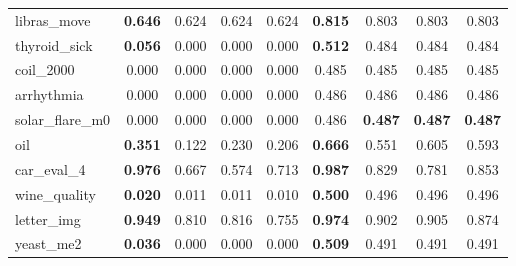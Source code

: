\begin{figure}[ht]
\begin{tabular}{p{22mm}|*4{p{14mm}}|*4{p{14mm}}}
        libras\_move&\multicolumn{1}{c}{\textbf{0.646}}&\multicolumn{1}{c}{0.624}&\multicolumn{1}{c}{0.624}&\multicolumn{1}{c|}{0.624}&\multicolumn{1}{c}{\textbf{0.815}}&\multicolumn{1}{c}{0.803}&\multicolumn{1}{c}{0.803}&\multicolumn{1}{c}{0.803}\\
        thyroid\_sick&\multicolumn{1}{c}{\textbf{0.056}}&\multicolumn{1}{c}{0.000}&\multicolumn{1}{c}{0.000}&\multicolumn{1}{c|}{0.000}&\multicolumn{1}{c}{\textbf{0.512}}&\multicolumn{1}{c}{0.484}&\multicolumn{1}{c}{0.484}&\multicolumn{1}{c}{0.484}\\
        coil\_2000&\multicolumn{1}{c}{0.000}&\multicolumn{1}{c}{0.000}&\multicolumn{1}{c}{0.000}&\multicolumn{1}{c|}{0.000}&\multicolumn{1}{c}{0.485}&\multicolumn{1}{c}{0.485}&\multicolumn{1}{c}{0.485}&\multicolumn{1}{c}{0.485}\\
        arrhythmia&\multicolumn{1}{c}{0.000}&\multicolumn{1}{c}{0.000}&\multicolumn{1}{c}{0.000}&\multicolumn{1}{c|}{0.000}&\multicolumn{1}{c}{0.486}&\multicolumn{1}{c}{0.486}&\multicolumn{1}{c}{0.486}&\multicolumn{1}{c}{0.486}\\
        solar\_flare\_m0&\multicolumn{1}{c}{0.000}&\multicolumn{1}{c}{0.000}&\multicolumn{1}{c}{0.000}&\multicolumn{1}{c|}{0.000}&\multicolumn{1}{c}{0.486}&\multicolumn{1}{c}{\textbf{0.487}}&\multicolumn{1}{c}{\textbf{0.487}}&\multicolumn{1}{c}{\textbf{0.487}}\\
        oil&\multicolumn{1}{c}{\textbf{0.351}}&\multicolumn{1}{c}{0.122}&\multicolumn{1}{c}{0.230}&\multicolumn{1}{c|}{0.206}&\multicolumn{1}{c}{\textbf{0.666}}&\multicolumn{1}{c}{0.551}&\multicolumn{1}{c}{0.605}&\multicolumn{1}{c}{0.593}\\
        car\_eval\_4&\multicolumn{1}{c}{\textbf{0.976}}&\multicolumn{1}{c}{0.667}&\multicolumn{1}{c}{0.574}&\multicolumn{1}{c|}{0.713}&\multicolumn{1}{c}{\textbf{0.987}}&\multicolumn{1}{c}{0.829}&\multicolumn{1}{c}{0.781}&\multicolumn{1}{c}{0.853}\\
        wine\_quality&\multicolumn{1}{c}{\textbf{0.020}}&\multicolumn{1}{c}{0.011}&\multicolumn{1}{c}{0.011}&\multicolumn{1}{c|}{0.010}&\multicolumn{1}{c}{\textbf{0.500}}&\multicolumn{1}{c}{0.496}&\multicolumn{1}{c}{0.496}&\multicolumn{1}{c}{0.496}\\
        letter\_img&\multicolumn{1}{c}{\textbf{0.949}}&\multicolumn{1}{c}{0.810}&\multicolumn{1}{c}{0.816}&\multicolumn{1}{c|}{0.755}&\multicolumn{1}{c}{\textbf{0.974}}&\multicolumn{1}{c}{0.902}&\multicolumn{1}{c}{0.905}&\multicolumn{1}{c}{0.874}\\
        yeast\_me2&\multicolumn{1}{c}{\textbf{0.036}}&\multicolumn{1}{c}{0.000}&\multicolumn{1}{c}{0.000}&\multicolumn{1}{c|}{0.000}&\multicolumn{1}{c}{\textbf{0.509}}&\multicolumn{1}{c}{0.491}&\multicolumn{1}{c}{0.491}&\multicolumn{1}{c}{0.491}\\

\end{tabular}
\end{figure}
